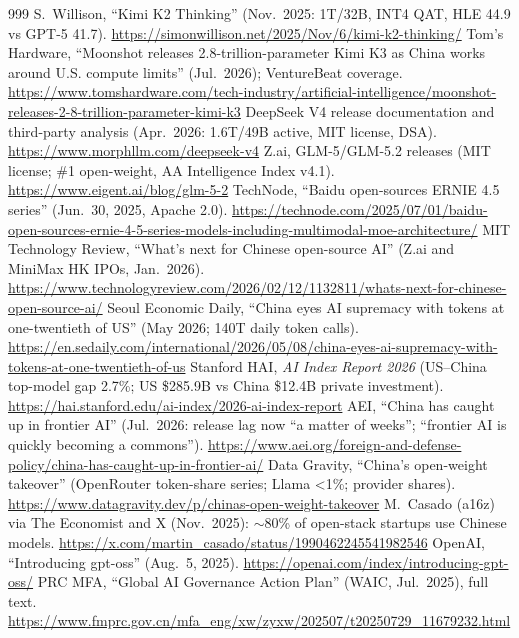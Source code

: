 \begin{thebibliography}{999}
 S.~Willison, ``Kimi K2 Thinking'' (Nov.\ 2025: 1T/32B, INT4 QAT, HLE 44.9 vs GPT-5 41.7). \url{https://simonwillison.net/2025/Nov/6/kimi-k2-thinking/}
 Tom's Hardware, ``Moonshot releases 2.8-trillion-parameter Kimi K3 as China works around U.S. compute limits'' (Jul.\ 2026); VentureBeat coverage. \url{https://www.tomshardware.com/tech-industry/artificial-intelligence/moonshot-releases-2-8-trillion-parameter-kimi-k3}
 DeepSeek V4 release documentation and third-party analysis (Apr.\ 2026: 1.6T/49B active, MIT license, DSA). \url{https://www.morphllm.com/deepseek-v4}
 Z.ai, GLM-5/GLM-5.2 releases (MIT license; \#1 open-weight, AA Intelligence Index v4.1). \url{https://www.eigent.ai/blog/glm-5-2}
 TechNode, ``Baidu open-sources ERNIE 4.5 series'' (Jun.\ 30, 2025, Apache 2.0). \url{https://technode.com/2025/07/01/baidu-open-sources-ernie-4-5-series-models-including-multimodal-moe-architecture/}
 MIT Technology Review, ``What's next for Chinese open-source AI'' (Z.ai and MiniMax HK IPOs, Jan.\ 2026). \url{https://www.technologyreview.com/2026/02/12/1132811/whats-next-for-chinese-open-source-ai/}
 Seoul Economic Daily, ``China eyes AI supremacy with tokens at one-twentieth of US'' (May 2026; 140T daily token calls). \url{https://en.sedaily.com/international/2026/05/08/china-eyes-ai-supremacy-with-tokens-at-one-twentieth-of-us}
 Stanford HAI, \emph{AI Index Report 2026} (US--China top-model gap 2.7\%; US \$285.9B vs China \$12.4B private investment). \url{https://hai.stanford.edu/ai-index/2026-ai-index-report}
 AEI, ``China has caught up in frontier AI'' (Jul.\ 2026: release lag now ``a matter of weeks''; ``frontier AI is quickly becoming a commons''). \url{https://www.aei.org/foreign-and-defense-policy/china-has-caught-up-in-frontier-ai/}
 Data Gravity, ``China's open-weight takeover'' (OpenRouter token-share series; Llama \textless1\%; provider shares). \url{https://www.datagravity.dev/p/chinas-open-weight-takeover}
 M.~Casado (a16z) via The Economist and X (Nov.\ 2025): $\sim$80\% of open-stack startups use Chinese models. \url{https://x.com/martin_casado/status/1990462245541982546}
 OpenAI, ``Introducing gpt-oss'' (Aug.\ 5, 2025). \url{https://openai.com/index/introducing-gpt-oss/}
 PRC MFA, ``Global AI Governance Action Plan'' (WAIC, Jul.\ 2025), full text. \url{https://www.fmprc.gov.cn/mfa_eng/xw/zyxw/202507/t20250729_11679232.html}

\end{thebibliography}
